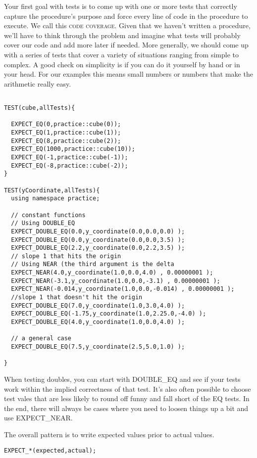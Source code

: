 \documentclass[]{tufte-handout}
\begin{document}
Your first goal with tests is to come up with one or more tests that correctly capture the procedure's purpose and force every line of code in the procedure to execute.  We call this \textsc{code coverage}. Given that we haven't written a procedure, we'll have to think through the problem and imagine what tests will probably cover our code and add more later if needed. More generally, we should come up with a series of tests that cover a variety of situations ranging from simple to complex. A good check on simplicity is if you can do it yourself by hand or in your head.  For our examples this means small numbers or numbers that make the arithmetic really easy. 


\begin{verbatim}

TEST(cube,allTests){

  EXPECT_EQ(0,practice::cube(0));
  EXPECT_EQ(1,practice::cube(1));
  EXPECT_EQ(8,practice::cube(2));
  EXPECT_EQ(1000,practice::cube(10));
  EXPECT_EQ(-1,practice::cube(-1));
  EXPECT_EQ(-8,practice::cube(-2));
}

TEST(yCoordinate,allTests){
  using namespace practice;

  // constant functions 
  // Using DOUBLE_EQ
  EXPECT_DOUBLE_EQ(0.0,y_coordinate(0.0,0.0,0.0) );
  EXPECT_DOUBLE_EQ(0.0,y_coordinate(0.0,0.0,3.5) );
  EXPECT_DOUBLE_EQ(2.2,y_coordinate(0.0,2.2,3.5) );
  // slope 1 that hits the origin
  // Using NEAR (the third argument is the delta
  EXPECT_NEAR(4.0,y_coordinate(1.0,0.0,4.0) , 0.00000001 );
  EXPECT_NEAR(-3.1,y_coordinate(1.0,0.0,-3.1) , 0.00000001 );
  EXPECT_NEAR(-0.014,y_coordinate(1.0,0.0,-0.014) , 0.00000001 );
  //slope 1 that doesn't hit the origin
  EXPECT_DOUBLE_EQ(7.0,y_coordinate(1.0,3.0,4.0) );
  EXPECT_DOUBLE_EQ(-1.75,y_coordinate(1.0,2.25.0,-4.0) );
  EXPECT_DOUBLE_EQ(4.0,y_coordinate(1.0,0.0,4.0) );
  
  // a general case
  EXPECT_DOUBLE_EQ(7.5,y_coordinate(2.5,5.0,1.0) );

}
\end{verbatim}

When testing doubles, you can start with DOUBLE\_EQ and see if your tests work within the implied correctness of that test.  It's also often possible to choose test vales that are less likely to round off funny and fall short of the EQ tests. In the end, there will always be cases where you need to loosen things up a bit and use EXPECT\_NEAR.

The overall pattern is to write expected values prior to actual values. 
\begin{verbatim}
EXPECT_*(expected,actual);
\end{verbatim}
\end{document}
